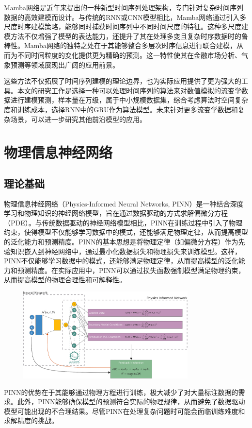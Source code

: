 Mamba网络是近年来提出的一种新型时间序列处理架构，专门针对复杂时间序列数据的高效建模而设计\cite{gu2024mamba}。与传统的RNN或CNN模型相比，Mamba网络通过引入多尺度时序建模策略，能够同时捕获时间序列中不同时间尺度的特征。这种多尺度建模方法不仅增强了模型的表达能力，还提升了其在处理多变且复杂时序数据时的鲁棒性。Mamba网络的独特之处在于其能够整合多层次时序信息进行联合建模，从而为不同时间粒度的变化提供更为精确的预测。这一特性使其在金融市场分析、气象预测等领域展现出广阔的应用前景。

这些方法不仅拓展了时间序列建模的理论边界，也为实际应用提供了更为强大的工具。本文的研究工作是选择一种可以处理时间序列的算法来对数值模拟的流变学数据进行建模预测，样本量在万级，属于中小规模数据集，综合考虑算法时空间复杂度和训练成本，选择RNN中的GRU作为算法模型。未来针对更多流变学数据和复杂场景，可以进一步研究其他前沿模型的应用。
\section{物理信息神经网络}
\subsection{理论基础}
物理信息神经网络（Physics-Informed Neural Networks, PINN）是一种结合深度学习和物理知识的神经网络模型，旨在通过数据驱动的方式求解偏微分方程（PDE）\cite{raissiPhysicsinformedNeuralNetworks2019a}。与传统数据驱动的神经网络模型相比，PINN在训练过程中引入了物理约束，使得模型不仅能够学习数据中的模式，还能够满足物理定律，从而提高模型的泛化能力和预测精度。PINN的基本思想是将物理定律（如偏微分方程）作为先验知识嵌入到神经网络中，通过最小化数据损失和物理损失来训练模型。这样，PINN不仅能够学习数据中的模式，还能够满足物理定律，从而提高模型的泛化能力和预测精度。在实际应用中，PINN可以通过损失函数强制模型满足物理约束，从而提高模型的物理合理性和可解释性。
\begin{figure}[htbp]
  \centering
  \includegraphics[width=0.8\textwidth]{Fig/pinn_logo.png}
\end{figure}
PINN的优势在于其能够通过物理方程进行训练，极大减少了对大量标注数据的需求。此外，PINN能够确保模型的预测符合实际的物理规律，从而避免了数据驱动模型可能出现的不合理结果。尽管PINN在处理复杂问题时可能会面临训练难度和求解精度的挑战。
